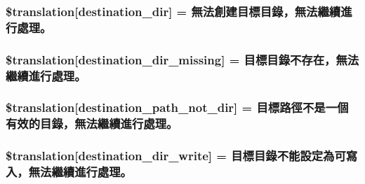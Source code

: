 \subsubsection[{\$translation}]{\setlength{\rightskip}{0pt plus 5cm}\$translation\mbox{[}\textquotesingle{}destination\+\_\+dir\textquotesingle{}\mbox{]} = \textquotesingle{}無法創建目標目錄，無法繼續進行處理。\textquotesingle{}}\label{class_8upload_8zh___t_w_8php_aff2427c72a2598aefa6d58df1dd18b08}
\hypertarget{class_8upload_8zh___t_w_8php_a9ef28d3cf09942c6c0a1e77fa09185e8}{}
\subsubsection[{\$translation}]{\setlength{\rightskip}{0pt plus 5cm}\$translation\mbox{[}\textquotesingle{}destination\+\_\+dir\+\_\+missing\textquotesingle{}\mbox{]} = \textquotesingle{}目標目錄不存在，無法繼續進行處理。\textquotesingle{}}\label{class_8upload_8zh___t_w_8php_a9ef28d3cf09942c6c0a1e77fa09185e8}
\hypertarget{class_8upload_8zh___t_w_8php_a5704a67137126e8c87b7a364175929d4}{}
\subsubsection[{\$translation}]{\setlength{\rightskip}{0pt plus 5cm}\$translation\mbox{[}\textquotesingle{}destination\+\_\+path\+\_\+not\+\_\+dir\textquotesingle{}\mbox{]} = \textquotesingle{}目標路徑不是一個有效的目錄，無法繼續進行處理。\textquotesingle{}}\label{class_8upload_8zh___t_w_8php_a5704a67137126e8c87b7a364175929d4}
\hypertarget{class_8upload_8zh___t_w_8php_a97608ea194a616db49141a0e6dee900c}{}
\subsubsection[{\$translation}]{\setlength{\rightskip}{0pt plus 5cm}\$translation\mbox{[}\textquotesingle{}destination\+\_\+dir\+\_\+write\textquotesingle{}\mbox{]} = \textquotesingle{}目標目錄不能設定為可寫入，無法繼續進行處理。\textquotesingle{}}\label{class_8upload_8zh___t_w_8php_a97608ea194a616db49141a0e6dee900c}
\hypertarget{class_8upload_8zh___t_w_8php_a40e4e1962226b89fd76da5819a9602b0}{}
